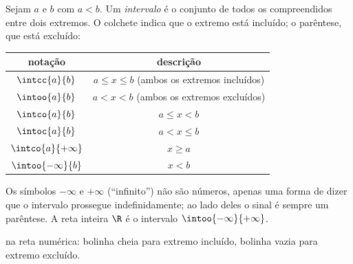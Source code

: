 \begin{definition}[Intervalo]\label{def:g10:numbers:interval}
Sejam $a$ e $b$  com $a < b$. Um
\emph{intervalo} é o conjunto de todos os 
compreendidos entre dois extremos. O colchete indica que o extremo está
incluído; o parêntese, que está excluído:
\begin{center}
\begin{tabular}{c|c}
notação & descrição \\
\hline
$\intcc{a}{b}$ & $a \leq x \leq b$ (ambos os extremos incluídos) \\
$\intoo{a}{b}$ & $a < x < b$ (ambos os extremos excluídos) \\
$\intco{a}{b}$ & $a \leq x < b$ \\
$\intoc{a}{b}$ & $a < x \leq b$ \\
$\intco{a}{+\infty}$ & $x \geq a$ \\
$\intoo{-\infty}{b}$ & $x < b$ \\
\end{tabular}
\end{center}
Os símbolos $-\infty$ e $+\infty$ (``infinito'') não são números, apenas
uma forma de dizer que o intervalo prossegue indefinidamente; ao lado
deles o sinal é sempre um parêntese. A reta inteira $\R$ é o intervalo
$\intoo{-\infty}{+\infty}$.
\end{definition}

\begin{omfigure}

{\small {} na reta numérica: bolinha cheia para extremo incluído,
bolinha vazia para extremo excluído.}
\end{omfigure}

